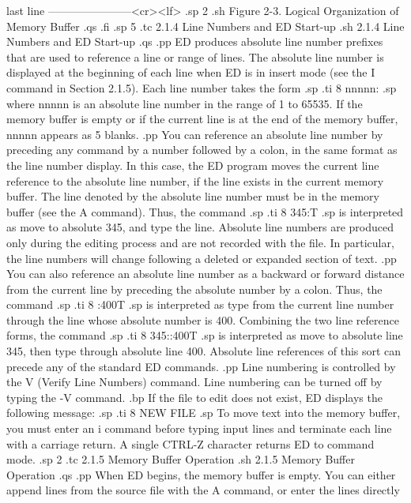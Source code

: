       last line         -----------------------<cr><lf>
.sp 2
.sh
        Figure 2-3.  Logical Organization of Memory Buffer
.qs
.fi
.sp 5
.tc         2.1.4  Line Numbers and ED Start-up
.sh
2.1.4  Line Numbers and ED Start-up
.qs
.pp
ED produces absolute line number prefixes that are used to reference a 
line or range of lines.  The absolute line number is displayed at the 
beginning of each line when ED is in insert mode (see the I command in 
Section 2.1.5). Each line number takes the form
.sp
.ti 8
nnnnn:
.sp
where nnnnn is an absolute line number in the range of 1 to 65535.  If the 
memory buffer is empty or if the current line is at the end of the memory 
buffer, nnnnn appears as 5 blanks.
.pp
You can reference an absolute line number by preceding any command by 
a number followed by a colon, in the same format as the line number display.  
In this case, the ED program moves the current line reference to the absolute 
line number, if the line exists in the current memory buffer.  The line 
denoted by the absolute line number must be in the memory buffer (see the 
A command).  Thus, the command
.sp
.ti 8
345:T
.sp
is interpreted as move to absolute 345, and type the line.   Absolute line 
numbers are produced only during the editing process and are not recorded 
with the file.  In particular, the line numbers will change following a 
deleted or expanded section of text.
.pp
You can also reference an absolute line number as a backward or forward 
distance from the current line by preceding the absolute number by a colon.  
Thus, the command
.sp
.ti 8
:400T
.sp
is interpreted as type from the current line number through the line whose 
absolute number is 400.  Combining the two line reference forms, the 
command
.sp
.ti 8
345::400T
.sp
is interpreted as move to absolute line 345, then type through 
absolute line 400.  Absolute line references of this sort can precede any 
of the standard ED commands. 
.pp
Line numbering is controlled by the V (Verify Line Numbers) command.  Line 
numbering can be turned off by typing the -V command.
.bp
If the file to edit does not exist, ED displays the following message:
.sp
.ti 8
NEW FILE
.sp
To move text into the memory buffer, you must enter an i command before typing
input lines and terminate each line with a carriage return.  A single 
CTRL-Z character returns ED to command mode.
.sp 2
.tc         2.1.5  Memory Buffer Operation
.sh
2.1.5  Memory Buffer Operation
.qs
.pp
When ED begins, the memory buffer is empty.  You can either append 
lines from the source file with the A command, or enter the lines directly 
